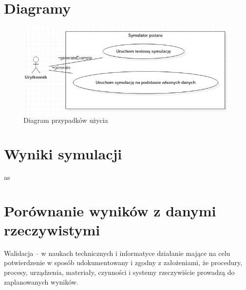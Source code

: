 \documentclass[a4paper, 11pt]{article}
\begin{document}
	\section*{Diagramy}
	\indent
	
		\begin{figure}[H]
			\centerline{\includegraphics[scale=0.9]{usecase1}}
			\raggedright{	\caption{Diagram przypadków użycia}}
		\end{figure}
	
	

	
	
	
	\section{Wyniki symulacji}
	\indent
	as
	\section*{Porównanie wyników z danymi rzeczywistymi}
	\indent
	
	Walidacja – w naukach technicznych i informatyce działanie mające
 	na celu potwierdzenie w sposób udokumentowany i zgodny z założeniami,
	 że procedury, procesy, urządzenia, materiały, czynności i systemy
	 rzeczywiście prowadzą do zaplanowanych wyników.\\
	
\end{document}
